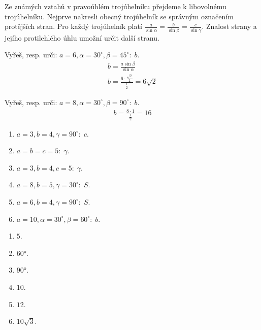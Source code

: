 \documentclass[11pt,a4paper]{article}
\begin{document}
Ze známých vztahů v pravoúhlém trojúhelníku přejdeme k libovolnému trojúhelníku. Nejprve nakresli obecný trojúhelník se správným označením protějších stran.
Pro každý trojúhelník platí $\frac{a}{\sin\alpha}=\frac{b}{\sin\beta}=\frac{c}{\sin\gamma}$. Znalost strany a jejího protilehlého úhlu umožní určit další stranu.
\begin{prikladReseniBox}[title={Příklad 1}]
Vyřeš, resp. urči: $a=6,\alpha=30^\circ,\beta=45^\circ:\;b$.
\tcblower
\[\begin{aligned}b=\frac{a\sin\beta}{\sin\alpha} \\ b=\frac{6\cdot\frac{\sqrt2}{2}}{\frac{1}{2}}=6\sqrt2\end{aligned}\]
\end{prikladReseniBox}
\begin{prikladReseniBox}[title={Příklad 2}]
Vyřeš, resp. urči: $a=8,\alpha=30^\circ,\beta=90^\circ:\;b$.
\tcblower
\[\begin{aligned}b=\frac{8\cdot1}{\frac{1}{2}}=16\end{aligned}\]
\end{prikladReseniBox}
\begin{zadaniReseniBox}[title={Samostatná práce 1}]
\begin{enumerate}[label=\alph*)]
\item $a=3,b=4,\gamma=90^\circ:\;c$.
\item $a=b=c=5:\;\gamma$.
\item $a=3,b=4,c=5:\;\gamma$.
\item $a=8,b=5,\gamma=30^\circ:\;S$.
\item $a=6,b=4,\gamma=90^\circ:\;S$.
\item $a=10,\alpha=30^\circ,\beta=60^\circ:\;b$.
\end{enumerate}
\tcblower
\begin{enumerate}[label=\alph*)]
\item $5$.
\item $60°$.
\item $90°$.
\item $10$.
\item $12$.
\item $10\sqrt3$.
\end{enumerate}
\end{zadaniReseniBox}
\end{document}
